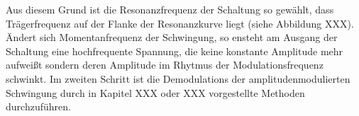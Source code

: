 Aus diesem Grund ist die Resonanzfrequenz der Schaltung so gewählt, dass Trägerfrequenz auf der Flanke der Resonanzkurve liegt (siehe Abbildung XXX). Ändert sich Momentanfrequenz der Schwingung, so ensteht am Ausgang der Schaltung eine hochfrequente Spannung, die keine konstante Amplitude mehr aufweißt sondern deren Amplitude im Rhytmus der Modulationsfrequenz schwinkt. Im zweiten Schritt ist die Demodulations der amplitudenmodulierten Schwingung durch in Kapitel XXX oder XXX vorgestellte Methoden durchzuführen. 


